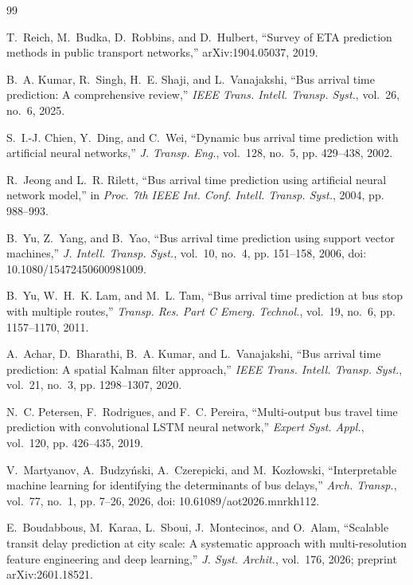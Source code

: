 \documentclass[conference,spanish]{IEEEtran}
\begin{document}

\begin{thebibliography}{99}

T.~Reich, M.~Budka, D.~Robbins, and D.~Hulbert,
``Survey of ETA prediction methods in public transport networks,''
arXiv:1904.05037, 2019.

B.~A. Kumar, R.~Singh, H.~E. Shaji, and L.~Vanajakshi,
``Bus arrival time prediction: A comprehensive review,''
\textit{IEEE Trans. Intell. Transp. Syst.}, vol.~26, no.~6, 2025.

S.~I.-J. Chien, Y.~Ding, and C.~Wei,
``Dynamic bus arrival time prediction with artificial neural networks,''
\textit{J. Transp. Eng.}, vol.~128, no.~5, pp. 429--438, 2002.

R.~Jeong and L.~R. Rilett,
``Bus arrival time prediction using artificial neural network model,''
in \textit{Proc. 7th IEEE Int. Conf. Intell. Transp. Syst.}, 2004, pp. 988--993.

B.~Yu, Z.~Yang, and B.~Yao,
``Bus arrival time prediction using support vector machines,''
\textit{J. Intell. Transp. Syst.}, vol.~10, no.~4, pp. 151--158, 2006,
doi: 10.1080/15472450600981009.

B.~Yu, W.~H.~K. Lam, and M.~L. Tam,
``Bus arrival time prediction at bus stop with multiple routes,''
\textit{Transp. Res. Part C Emerg. Technol.}, vol.~19, no.~6, pp. 1157--1170, 2011.

A.~Achar, D.~Bharathi, B.~A. Kumar, and L.~Vanajakshi,
``Bus arrival time prediction: A spatial Kalman filter approach,''
\textit{IEEE Trans. Intell. Transp. Syst.}, vol.~21, no.~3, pp. 1298--1307, 2020.

N.~C. Petersen, F.~Rodrigues, and F.~C. Pereira,
``Multi-output bus travel time prediction with convolutional LSTM neural network,''
\textit{Expert Syst. Appl.}, vol.~120, pp. 426--435, 2019.

V.~Martyanov, A.~Budzy{\'n}ski, A.~Czerepicki, and M.~Koz{\l}owski,
``Interpretable machine learning for identifying the determinants of bus delays,''
\textit{Arch. Transp.}, vol.~77, no.~1, pp. 7--26, 2026,
doi: 10.61089/aot2026.mnrkh112.

E.~Boudabbous, M.~Karaa, L.~Sboui, J.~Montecinos, and O.~Alam,
``Scalable transit delay prediction at city scale: A systematic approach with multi-resolution feature engineering and deep learning,''
\textit{J. Syst. Archit.}, vol.~176, 2026; preprint arXiv:2601.18521.


\end{thebibliography}
\end{document}
